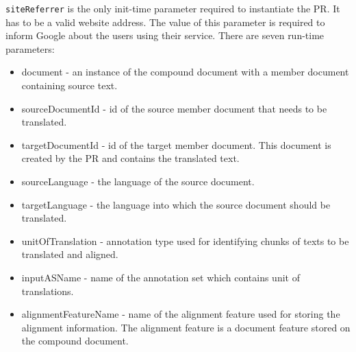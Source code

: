 {\tt siteReferrer} is the only init-time parameter required to instantiate the
PR. It has to be a valid website address. The value of this parameter is 
required to inform Google about the users using their service. There are seven
run-time parameters:

\begin{itemize}
\item document - an instance of the compound document with a member document 
containing source text.
\item sourceDocumentId - id of the source member document that needs to be 
translated.
\item targetDocumentId - id of the target member document. This document is 
created by the PR and contains the translated text.
\item sourceLanguage - the language of the source document.
\item targetLanguage - the language into which the source document should be 
translated.
\item unitOfTranslation - annotation type used for identifying chunks of texts 
to be translated and aligned.
\item inputASName - name of the annotation set which contains unit of 
translations.
\item alignmentFeatureName - name of the alignment feature used for storing the
alignment information.  The alignment feature is a document feature stored on
the compound document.
\end{itemize}
